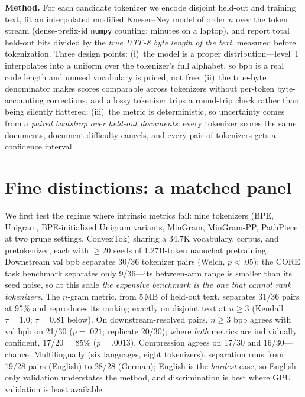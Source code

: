 \documentclass[10pt,twocolumn]{article}
\begin{document}
\textbf{Method.} For each candidate tokenizer we encode disjoint held-out and training text, fit an interpolated modified Kneser--Ney model \cite{chen1998} of order $n$ over the token stream (dense-prefix-id \texttt{numpy} counting; minutes on a laptop), and report total held-out bits divided by the \emph{true UTF-8 byte length of the text}, measured before tokenization. Three design points: (i)~the model is a proper distribution---level~1 interpolates into a uniform over the tokenizer's full alphabet, so bpb is a real code length and unused vocabulary is priced, not free; (ii)~the true-byte denominator makes scores comparable across tokenizers without per-token byte-accounting corrections, and a lossy tokenizer trips a round-trip check rather than being silently flattered; (iii)~the metric is deterministic, so uncertainty comes from a \emph{paired bootstrap over held-out documents}: every tokenizer scores the same documents, document difficulty cancels, and every pair of tokenizers gets a confidence interval.

\section{Fine distinctions: a matched panel}
We first test the regime where intrinsic metrics fail: nine tokenizers (BPE, Unigram, BPE-initialized Unigram variants, MinGram, MinGram-PP, PathPiece at two prune settings, ConvexTok) sharing a 34.7K vocabulary, corpus, and pretokenizer, each with $\geq$20 seeds of 1.27B-token nanochat \cite{karpathy2025} pretraining. Downstream val bpb separates 30/36 tokenizer pairs (Welch, $p{<}.05$); the CORE task benchmark separates only 9/36---its between-arm range is smaller than its seed noise, so at this scale \emph{the expensive benchmark is the one that cannot rank tokenizers}. The $n$-gram metric, from 5\,MB of held-out text, separates 31/36 pairs at 95\% and reproduces its ranking exactly on disjoint text at $n{\geq}3$ (Kendall $\tau{=}1.0$; $\tau{=}0.81$ below). On downstream-resolved pairs, $n{\geq}3$ bpb agrees with val bpb on 21/30 ($p{=}.021$; replicate 20/30); where \emph{both} metrics are individually confident, 17/20 = 85\% ($p{=}.0013$). Compression agrees on 17/30 and 16/30---chance. Multilingually (six languages, eight tokenizers), separation runs from 19/28 pairs (English) to 28/28 (German); English is the \emph{hardest} case, so English-only validation understates the method, and discrimination is best where GPU validation is least available.
\end{document}
